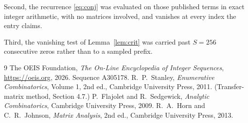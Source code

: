 \documentclass[11pt,a4paper]{article}
\theoremstyle{plain}
\theoremstyle{definition}
\begin{document}
Second, the recurrence \eqref{eq:conj} was evaluated on those published terms in exact
integer arithmetic, with no matrices involved, and vanishes at every index the entry claims.

Third, the vanishing test of Lemma~\ref{lem:crit} was carried past $S=256$ consecutive
zeros rather than to a sampled prefix.

\begin{thebibliography}{9}
 The OEIS Foundation, \emph{The On-Line Encyclopedia of Integer
Sequences}, \url{https://oeis.org}, 2026. Sequence A305178.
 R.~P.~Stanley, \emph{Enumerative Combinatorics}, Volume 1, 2nd ed.,
Cambridge University Press, 2011. (Transfer-matrix method, Section 4.7.)
 P.~Flajolet and R.~Sedgewick, \emph{Analytic Combinatorics}, Cambridge
University Press, 2009.
 R.~A.~Horn and C.~R.~Johnson, \emph{Matrix Analysis}, 2nd ed., Cambridge
University Press, 2013.
\end{thebibliography}
\end{document}
